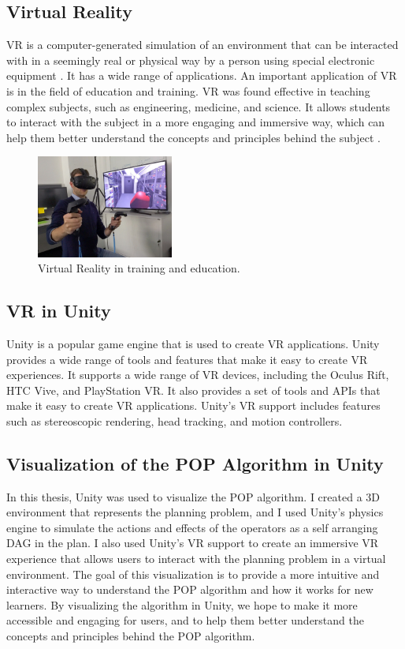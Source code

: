 \subsection{Virtual Reality} \label{subsec:virtual_reality}
\acf{VR} is a computer-generated simulation of an environment that can be interacted with in a seemingly real or physical way by a person using special electronic equipment \cite{WikiVR}. It has a wide range of applications. An important application of \ac{VR} is in the field of education and training. \ac{VR} was found effective in teaching complex subjects, such as engineering, medicine, and science. It allows students to interact with the subject in a more engaging and immersive way, which can help them better understand the concepts and principles behind the subject \cite{VRapps}\cite{WikiVR}.

\begin{figure}[H]
      \centering
      \includegraphics[width=0.4\textwidth]{images/VR.jpg}
      \caption{Virtual Reality in training and education. \cite{WikiVR}}
      \label{fig:vr_training}
\end{figure}


\subsection{\acf{VR} in Unity} \label{subsec:vr_in_unity}
Unity is a popular game engine that is used to create \ac{VR} applications. Unity provides a wide range of tools and features that make it easy to create \ac{VR} experiences. It supports a wide range of \ac{VR} devices, including the Oculus Rift, HTC Vive, and PlayStation \ac{VR}. It also provides a set of tools and APIs that make it easy to create \ac{VR} applications. Unity's \ac{VR} support includes features such as stereoscopic rendering, head tracking, and motion controllers.
\subsection{Visualization of the \acf{POP} Algorithm in Unity} \label{subsec:visualization_pop_unity}
In this thesis, Unity was used to visualize the \ac{POP} algorithm.
I created a 3D environment that represents the planning problem, and I used Unity's physics engine to simulate the actions and effects of the operators as a self arranging \ac{DAG} in the plan. I also used Unity's \ac{VR} support to create an immersive \ac{VR} experience that allows users to interact with the planning problem in a virtual environment. The goal of this visualization is to provide a more intuitive and interactive way to understand the \ac{POP} algorithm and how it works for new learners. By visualizing the algorithm in Unity, we hope to make it more accessible and engaging for users, and to help them better understand the concepts and principles behind the \ac{POP} algorithm.
